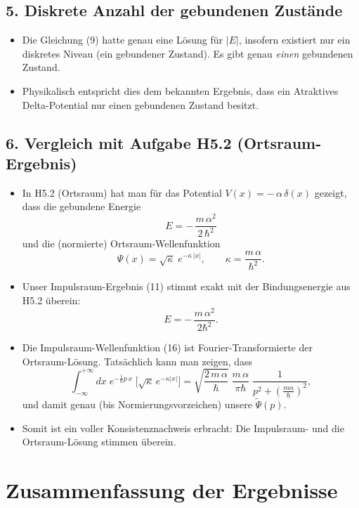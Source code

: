 \documentclass[12pt,a4paper]{scrartcl}
\begin{document}
\subsection*{5. Diskrete Anzahl der gebundenen Zustände}

\begin{itemize}
  \item Die Gleichung (9) hatte genau eine Lösung für $|E|$, insofern existiert nur ein diskretes Niveau (ein gebundener Zustand). Es gibt genau \emph{einen} gebundenen Zustand.
  \item Physikalisch entspricht dies dem bekannten Ergebnis, dass ein Atraktives Delta-Potential nur einen gebundenen Zustand besitzt.
\end{itemize}

\subsection*{6. Vergleich mit Aufgabe H5.2 (Ortsraum-Ergebnis)}

\begin{itemize}
  \item In H5.2 (Ortsraum) hat man für das Potential $V(x) = -\,\alpha\,\delta(x)$ gezeigt, dass die gebundene Energie
  \[
    E = -\,\frac{m\,\alpha^2}{2\,\hbar^2}
  \]
  und die (normierte) Ortsraum-Wellenfunktion
  \[
    \Psi(x) = \sqrt{\kappa}\;e^{-\kappa\,|x|}, \qquad \kappa = \frac{m\,\alpha}{\hbar^2}.
  \]
  \item Unser Impulsraum-Ergebnis (11) stimmt exakt mit der Bindungsenergie aus H5.2 überein:
  \[
    E = -\,\frac{m\,\alpha^2}{2\hbar^2}.
  \]
  \item Die Impulsraum-Wellenfunktion (16) ist Fourier-Transformierte der Ortsraum-Lösung. Tatsächlich kann man zeigen, dass
  \[
    \int_{-\infty}^{+\infty} dx\; e^{-\frac{\mathrm{i}}{\hbar} p\,x}\; \bigl[\sqrt{\kappa}\,e^{-\kappa|x|}\bigr]
    = \sqrt{\frac{2\,m\,\alpha}{\hbar}} \;\frac{m\,\alpha}{\pi\hbar}\;\frac{1}{p^2 + \left(\frac{m\alpha}{\hbar}\right)^2},
  \]
  und damit genau (bis Normierungsvorzeichen) unsere $\widetilde\Psi(p)$.
  \item Somit ist ein voller Konsistenznachweis erbracht: Die Impulsraum- und die Ortsraum-Lösung stimmen überein.
\end{itemize}

\section*{Zusammenfassung der Ergebnisse}
\end{document}

